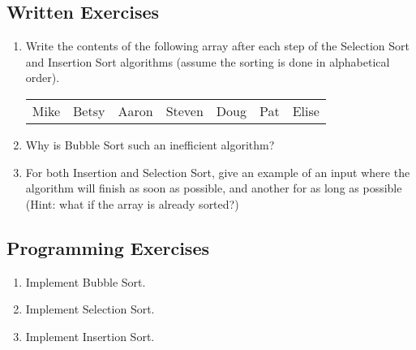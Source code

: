 \subsection{Written Exercises}

\begin{enumerate}

\item Write the contents of the following array after each step of the Selection Sort and Insertion Sort algorithms (assume the sorting is done in alphabetical order).
\begin{table}
\begin{tabular}{l l l l l l l}
Mike & Betsy & Aaron & Steven & Doug & Pat & Elise
\end{tabular}
\end{table}

\item Why is Bubble Sort such an inefficient algorithm?

\item For both Insertion and Selection Sort, give an example of an input where the algorithm will finish as soon as possible, and another for as long as possible (Hint: what if the array is already sorted?)

\end{enumerate}

\subsection{Programming Exercises}

\begin{enumerate}

\item Implement Bubble Sort.
\item Implement Selection Sort.
\item Implement Insertion Sort.

\end{enumerate}